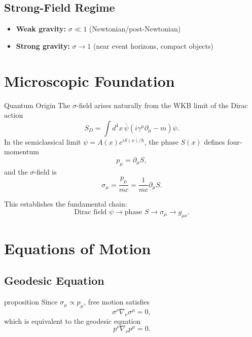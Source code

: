 \documentclass[11pt,a4paper]{article}
\theoremstyle{definition}
\theoremstyle{remark}
\begin{document}
	\subsection{Strong-Field Regime}
	
	\begin{itemize}
		\item \textbf{Weak gravity:} $\sigma \ll 1$ (Newtonian/post-Newtonian)
		\item \textbf{Strong gravity:} $\sigma \to 1$ (near event horizons, compact objects)
	\end{itemize}
	
	\section{Microscopic Foundation}
	
	Quantum Origin
		The $\sigma$-field arises naturally from the WKB limit of the Dirac action
		\begin{equation}
			S_D = \int d^4x \, \bar\psi(i\gamma^\mu \partial_\mu - m)\psi.
		\end{equation}
		In the semiclassical limit $\psi = A(x) e^{iS(x)/\hbar}$, the phase $S(x)$ defines four-momentum
		\begin{equation}
			p_\mu = \partial_\mu S,
		\end{equation}
		and the $\sigma$-field is
		\begin{equation}
			\boxed{\sigma_\mu = \frac{p_\mu}{mc} = \frac{1}{mc} \partial_\mu S.}
		\end{equation}
	
	This establishes the fundamental chain:
	\begin{equation}
		\text{Dirac field } \psi \longrightarrow \text{phase } S \longrightarrow \sigma_\mu \longrightarrow g_{\mu\nu}.
	\end{equation}
	
	\section{Equations of Motion}
	
	\subsection{Geodesic Equation}
	
	proposition
		Since $\sigma_\mu \propto p_\mu$, free motion satisfies
		\begin{equation}
			\sigma^\nu \nabla_\nu \sigma^\mu = 0,
		\end{equation}
		which is equivalent to the geodesic equation
		\begin{equation}
			p^\nu \nabla_\nu p^\mu = 0.
		\end{equation}
	
\end{document}
